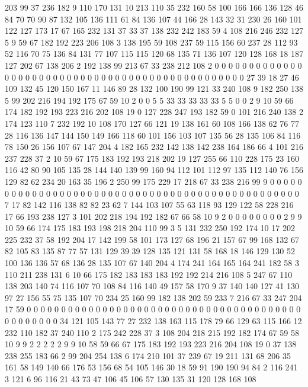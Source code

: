 203 99 37 236 182 9 110 170 131 10 213 110 35 232 160 58 100 166 166 136
128 46 84 70 70 90 87 132 105 136 111 61 84 136 107 44 166 28 143 32
31 230 26 160 101 122 127 173 17 67 165 232 131 37 33 37 138 232 242 183
59 4 108 216 246 232 127 5 9 59 67 182 192 223 206 108 3 138 195 59
108 237 59 115 156 60 237 28 112 93 52 116 70 75 136 84 131 77 107 115
115 120 68 135 71 136 107 120 128 168 18 187 127 202 67 138 206 2 192 138
99 213 67 33 238 212 108 2 0 0 0 0 0 0 0 0 0 0 0 0
0 0 0 0 0 0 0 0 0 0 0 0 0 0 0 0 0 0 0 0
0 0 0 0 0 0 0 0 0 0 0 0 0 0 0 0 27 39 18 27
46 109 132 45 120 150 167 11 146 89 28 132 100 190 99 121 33 240 108 9
182 250 138 5 99 202 216 194 192 175 67 59 10 2 0 0 5 5 33 33
33 33 33 5 5 0 0 2 9 10 59 66 174 182 192 193 223 216 202 108
19 0 127 228 247 193 182 59 0 101 216 240 138 2 174 123 110 7 232 192
10 108 170 127 66 121 19 138 161 60 108 166 138 62 76 77 28 116 136 147
144 150 149 166 118 60 101 156 103 107 135 56 28 135 106 84 116 78 150 26
156 107 67 147 204 4 182 165 232 142 138 142 238 164 186 66 4 101 216 237
228 37 2 10 59 67 175 183 192 193 218 202 19 127 255 66 110 228 175 23
160 116 42 80 90 105 135 28 144 140 139 99 160 94 112 101 112 97 135 112
140 76 156 129 82 62 234 20 163 35 196 2 250 99 175 229 17 218 67 33
238 216 99 9 0 0 0 0 0 0 0 0 0 0 0 0 0 0 0 0
0 0 0 0 0 0 0 0 0 0 0 0 0 0 0 0 0 0 0 0
0 0 0 0 0 0 0 0 0 0 0 0 7 17 82 142 116 138 82 82
23 62 7 144 103 107 55 63 118 93 129 122 58 228 216 17 66 193 238 127
3 101 202 218 194 192 182 67 66 58 10 9 2 0 0 0 0 0 0 0
0 2 9 9 10 59 66 174 175 183 193 198 218 204 110 99 3 5 131 232
250 192 174 10 17 202 225 232 37 58 192 204 17 142 199 58 101 173 127 68
196 21 157 67 99 168 132 67 82 105 83 135 87 77 57 131 129 39 39 128
135 121 131 58 168 18 146 129 130 52 100 136 136 57 68 136 28 135 107 67
140 204 4 174 241 164 165 164 241 182 58 3 110 211 238 131 6 10 66 175
182 183 183 183 192 192 214 216 108 5 247 67 110 138 203 140 74 116 107 70
108 84 116 140 49 157 58 170 9 37 140 140 127 41 130 97 27 156 55 75
135 107 70 234 25 160 99 182 138 202 59 233 7 216 67 33 247 204 17 59
0 0 0 0 0 0 0 0 0 0 0 0 0 0 0 0 0 0 0 0
0 0 0 0 0 0 0 0 0 0 0 0 0 0 0 0 0 0 0 0
0 0 0 0 0 0 0 0 34 121 105 143 77 27 232 138 163 115 178 79
66 129 63 115 166 12 232 110 182 37 240 110 2 175 242 228 37 3 108 204
218 215 192 182 174 67 59 58 10 9 9 2 2 2 2 2 9 9 10 58
59 66 67 175 183 192 193 223 216 204 108 19 0 37 138 238 255 183 66 2
99 204 254 138 6 174 210 101 37 239 67 19 211 131 68 206 35 161 58 149
140 66 176 53 156 68 54 105 146 30 18 59 91 190 190 94 84 2 116 241
3 121 6 96 116 21 43 73 47 106 45 106 57 130 135 31 120 128 168 108

